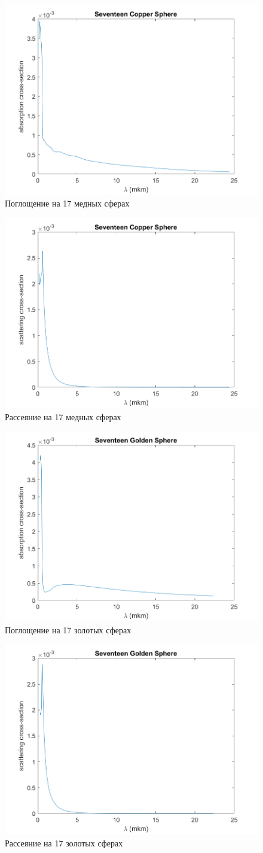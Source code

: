 \begin{figure}[h!]
	\centering
	\includegraphics[width=0.5\linewidth]{seventeenCopperSphereAbsorptionSection}
	\caption{Поглощение на 17 медных сферах}
	\label{fig:seventeenCopperSphereAbsorptionSection}
\end{figure} 
\begin{figure}[h!]
	\centering
	\includegraphics[width=0.5\linewidth]{seventeenCopperSphereCrossSection}
	\caption{Рассеяние на 17 медных сферах}
	\label{fig:seventeenCopperSphereCrossSection}
\end{figure}
\begin{figure}[h!]
	\centering
	\includegraphics[width=0.5\linewidth]{seventeenGoldSphereAbsorptionSection}
	\caption{Поглощение на 17 золотых сферах}
	\label{fig:seventeenGoldSphereAbsorptionSection}
\end{figure} 
\begin{figure}[h!]
	\centering
	\includegraphics[width=0.5\linewidth]{seventeenGoldSphereCrossSection}
	\caption{Рассеяние на 17 золотых сферах}
	\label{fig:seventeenGoldSphereCrossSection}
\end{figure}
